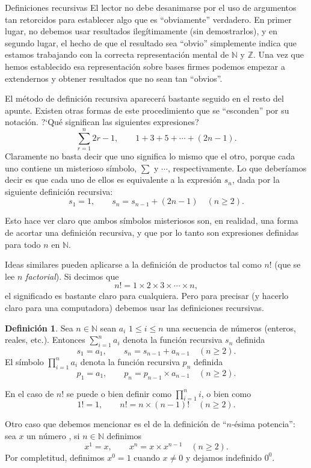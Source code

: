 \documentclass[11pt,spanish,makeidx]{amsbook}
\theoremstyle{definition}
\newtheorem{definicion}{Definici\'on}[section]
\theoremstyle{remark}
\newcommand \NN{{\mathbb N}}
\begin{document}
\begin{section}{Definiciones recursivas}
El lector no debe desanimarse por el uso de argumentos tan retorcidos para establecer algo que es ``obviamente'' verdadero. En primer lugar, no debemos usar resultados ilegítimamente (sin demostrarlos), y en segundo lugar, el hecho de que el resultado sea ``obvio'' simplemente indica que estamos trabajando con la correcta representación mental de $\mathbb N$ y $\mathbb Z$. Una vez que hemos establecido esa representación sobre bases firmes podemos empezar a extendernos y obtener resultados que no sean tan ``obvios''.

El método de definición recursiva aparecerá bastante seguido en el resto del apunte. Existen otras formas de este procedimiento que se ``esconden'' por su notación. ?`Qué significan las siguientes expresiones?
$$
\sum_{r=1}^{n} 2r-1,\qquad 1+3+5+\cdots +(2n-1).
$$
Claramente no basta decir que uno significa lo mismo que el otro, porque cada uno contiene un misterioso símbolo, $\sum$ y $\cdots$, respectivamente. Lo que deberíamos decir es que cada uno de ellos es equivalente a la expresión $s_n$, dada por la siguiente definición recursiva:
$$
s_1= 1, \qquad s_n = s_{n-1} +(2n-1) \quad (n\ge 2).
$$

Esto hace ver claro que ambos símbolos misteriosos son, en realidad, una forma de acortar una definición recursiva, y que por lo tanto son expresiones definidas para todo $n$ en $\mathbb N$.

Ideas similares pueden aplicarse a la definición de productos tal como $n!$ (que se lee $n$ {\it factorial}). Si decimos que
$$
n!=1 \times 2 \times 3 \times \cdots \times n,
$$
el significado es bastante claro para cualquiera. Pero para precisar (y hacerlo claro para una computadora) debemos usar las definiciones recursivas.

\begin{definicion} Sea $n \in \NN$ sean $a_i$  $1 \le i \le n$ una secuencia de números (enteros, reales, etc.). Entonces $\sum_{i=1}^{n} a_i$  denota la función recursiva $s_n$ definida  
	$$
	s_1= a_1, \qquad s_n = s_{n-1} + a_{n-1} \quad (n\ge 2).
	$$
	El símbolo $\prod_{i=1}^{n} a_i$ denota la función recursiva $p_n$ definida  
	$$
	p_1= a_1, \qquad p_n = p_{n-1} \times  a_{n-1} \quad (n\ge 2).
	$$
\end{definicion}



En  el caso de $n!$ se puede  o bien definir como $\prod_{i=1}^{n} i$, o bien como
$$
1!=1,\qquad n!=n \times (n-1)! \quad (n\ge 2).
$$

Otro caso que debemos mencionar es  el de la definición de ``$n$-ésima potencia'': sea $x$ un  número , si $n \in \NN$ definimos
$$
x^1=x,\qquad x^n= x \times x^{n-1} \quad (n\ge 2).
$$
Por completitud,  definimos $x^0=1$ cuando $x \ne 0$ y  dejamos indefinido $0^0$. 



\end{section}
\end{document}
